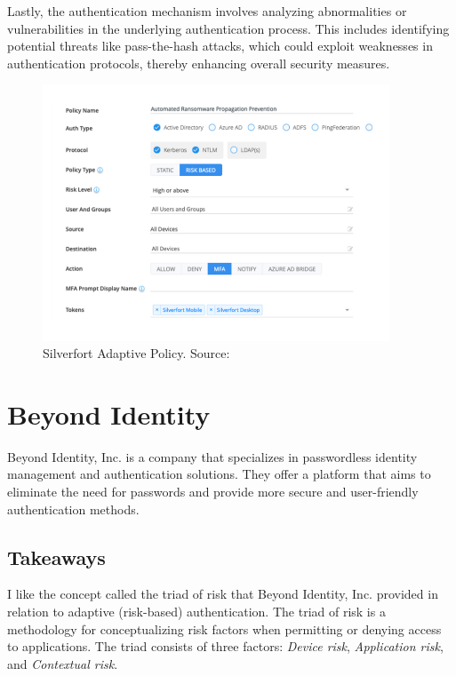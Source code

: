 Lastly, the authentication mechanism involves analyzing abnormalities or vulnerabilities in the underlying authentication process.
This includes identifying potential threats like pass-the-hash attacks, which could exploit weaknesses in authentication protocols, thereby enhancing overall security measures. \cite{existing-silverfort-risk} \cite{existing-silverfort-analysis}


\begin{figure}[htbp]
  \centering
  \includegraphics[width=0.92\textwidth]{img/silverfort-auth-policy.png}
  \caption[Silverfort Adaptive Policy]{Silverfort Adaptive Policy. Source: \cite{example_silverfort}}
  \label{fig:silverfort-auth-policy}
\end{figure}

\newpage
\section{Beyond Identity}

Beyond Identity, Inc. is a company that specializes in passwordless identity management and authentication solutions. They offer a platform that aims to eliminate the need for passwords and provide more secure and user-friendly authentication methods.

\subsection*{Takeaways}
I like the concept called the triad of risk that Beyond Identity, Inc. provided in relation to adaptive (risk-based) authentication.
The triad of risk is a methodology for conceptualizing risk factors when permitting or denying access to applications.
The triad consists of three factors: \textit{Device risk}, \textit{Application risk}, and \textit{Contextual risk}.

